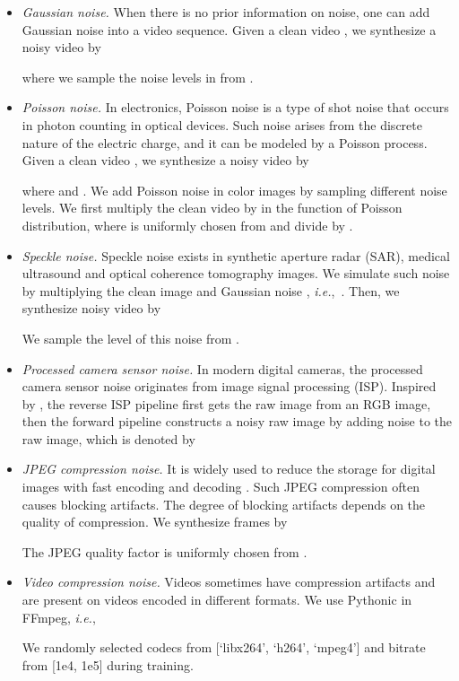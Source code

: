 \documentclass[10pt,twocolumn,letterpaper]{article}
\def\ie{\mbox{\textit{i.e.}, }}
\newlength \g
\begin{document}
\begin{itemize}[leftmargin=*]
    \vspace{-0.2cm}
    \item \emph{Gaussian noise.}
    When there is no prior information on noise, one can add Gaussian noise into a video sequence.
    Given a clean video , we synthesize a noisy video by
    
    where we sample the noise levels  in  from .
    \vspace{-0.2cm}
    \item \emph{Poisson noise.}
    In electronics, Poisson noise is a type of shot noise that occurs in photon counting in optical devices.
    Such noise arises from the discrete nature of the electric charge, and it can be modeled by a Poisson process. 
Given a clean video , we synthesize a noisy video by 
    
    where  and . 
    We add Poisson noise in color images by sampling different noise levels.
    We first multiply the clean video by  in the function of Poisson distribution, where  is uniformly chosen from  and divide by .
    \vspace{-0.1cm}
    \item \emph{Speckle noise.}
    Speckle noise exists in synthetic aperture radar (SAR), medical ultrasound and optical coherence tomography images.
    We simulate such noise by multiplying the clean image  and Gaussian noise , \ie .
    Then, we synthesize noisy video by 
    
    We sample the level of this noise from .
    \vspace{-0.2cm}
    \item \emph{Processed camera sensor noise.}
    In modern digital cameras, the processed camera sensor noise originates from image signal processing (ISP). 
    Inspired by \cite{zhang2022scunet}, the reverse ISP pipeline first gets the raw image from an RGB image, then the forward pipeline constructs a noisy raw image by adding noise to the raw image,
    which is denoted by 

    \item \emph{JPEG compression noise.}
    It is widely used to reduce the storage for digital images with fast encoding and decoding \cite{zhang2021designing}.
    Such JPEG compression often causes  blocking artifacts.
    The degree of blocking artifacts depends on the quality of compression.
    We synthesize frames by 
    
    The JPEG quality factor is uniformly chosen from .
    \vspace{-0.2cm}
    \item \emph{Video compression noise.}
    Videos sometimes have compression artifacts and are present on videos encoded in different formats.
    We use Pythonic  in FFmpeg, \ie 
    
    We randomly selected codecs from [`libx264', `h264', `mpeg4'] and bitrate from [1e4, 1e5] during training.
\end{itemize}
\end{document}
